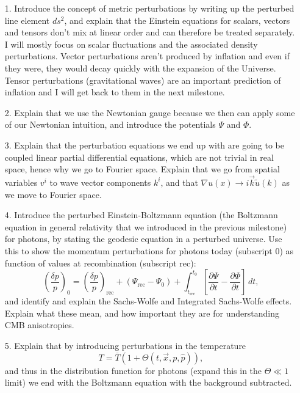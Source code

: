 \documentclass{aa}
\begin{document}
\begin{enumerate}
  \item [1.] Introduce the concept of metric perturbations by writing up the perturbed line element $ds^2$, and explain that the Einstein equations for scalars, vectors and tensors don't mix at linear order and can therefore be treated separately. I will mostly focus on scalar fluctuations and the associated density perturbations. Vector perturbations aren't produced by inflation and even if they were, they would decay quickly with the expansion of the Universe. Tensor perturbations (gravitational waves) are an important prediction of inflation and I will get back to them in the next milestone. 
  \item [2.] Explain that we use the Newtonian gauge because we then can apply some of our Newtonian intuition, and introduce the potentials $\Psi$ and $\Phi$. 
  \item [3.] Explain that the perturbation equations we end up with are going to be coupled linear partial differential equations, which are not trivial in real space, hence why we go to Fourier space. Explain that we go from spatial variables $v^i$ to wave vector components $k^i$, and that $\nabla u(x)\to i\vec{k}\tilde{u}(k)$ as we move to Fourier space.
  \item [4.] Introduce the perturbed Einstein-Boltzmann equation (the Boltzmann equation in general relativity that we introduced in the previous milestone) for photons, by stating the geodesic equation in a perturbed universe. Use this to show the momentum perturbations for photons today (subscript 0) as function of values at recombination (subscript rec): 
  \begin{equation}
    \left(\frac{\delta p}{p}\right)_0 = \left(\frac{\delta p}{p}\right)_\text{rec} + \left(\Psi_\text{rec} - \Psi_0\right) + \int_{t_\text{rec}}^{t_0}\left[\frac{\partial\Psi}{\partial t} - \frac{\partial \Phi}{\partial t} \right]\,dt,
  \end{equation}
  and identify and explain the Sachs-Wolfe and Integrated Sachs-Wolfe effects. Explain what these mean, and how important they are for understanding CMB anisotropies.
  \item [5.] Explain that by introducing perturbations in the temperature 
  \begin{equation}
    T=\overline{T}(1+\Theta(t,\vec{x},p,\hat{p})),
  \end{equation}
  and thus in the distribution function for photons (expand this in the $\Theta\ll1$ limit) we end with the Boltzmann equation with the background subtracted.

\end{enumerate}
\end{document}
